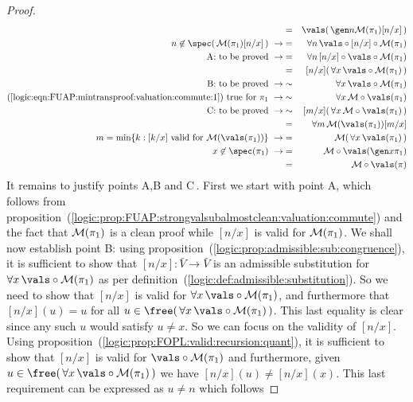 \begin{proof}
\begin{eqnarray*}
    &=&\vals(\,\gen n{\cal M}(\pi_{1})[n/x]\,)\\
    n\not\in\spec(\,{\cal M}(\pi_{1})[n/x]\,)\ \rightarrow
    &=&\forall n\,\vals\circ[n/x]\circ{\cal M}(\pi_{1})\\
    \mbox{A: to be proved}\ \rightarrow
    &=&\forall n\,[n/x]\circ\vals\circ{\cal M}(\pi_{1})\\
    &=&[n/x](\,\forall x\,\vals\circ{\cal M}(\pi_{1})\,)\\
    \mbox{B: to be proved}\ \rightarrow&\sim&\forall x\,\vals\circ{\cal M}(\pi_{1})\\
    \mbox{(\ref{logic:eqn:FUAP:mintransproof:valuation:commute:1}) true for $\pi_{1}$}\ \rightarrow
    &\sim&\forall x\,{\cal M}\circ\vals(\pi_{1})\\
    \mbox{C: to be proved}\ \rightarrow
    &\sim&[m/x](\,\forall x\,{\cal M}\circ\vals(\pi_{1})\,)\\
    &=&\forall m\,{\cal M}(\vals(\pi_{1}))[m/x]\\
    m=\min\{k:[k/x]\ \mbox{valid for}\ {\cal M}(\vals(\pi_{1}))\}\ \rightarrow
    &=&{\cal M}(\,\forall x\,\vals(\pi_{1})\,)\\
    x\not\in\spec(\pi_{1})\ \rightarrow&=&{\cal M}\circ\vals(\gen x\pi_{1})\\
    &=&{\cal M}\circ\vals(\pi)\\
    \end{eqnarray*}
It remains to justify points A,B and C\,. First we start with point
A, which follows from
proposition~(\ref{logic:prop:FUAP:strongvalsubalmostclean:valuation:commute})
and the fact that ${\cal M}(\pi_{1})$ is a clean proof while $[n/x]$
is valid for ${\cal M}(\pi_{1})$. We shall now establish point B:
using proposition~(\ref{logic:prop:admissible:sub:congruence}), it
is sufficient to show that $[n/x]:\bar{V}\to\bar{V}$ is an
admissible substitution for $\forall x\,\vals\circ{\cal M}(\pi_{1})$
as per definition~(\ref{logic:def:admissible:substitution}). So we
need to show that $[n/x]$ is valid for $\forall x\,\vals\circ{\cal
M}(\pi_{1})$, and furthermore that $[n/x](u)=u$ for all
$u\in\free(\,\forall x\,\vals\circ{\cal M}(\pi_{1})\,)$. This last
equality is clear since any such $u$ would satisfy $u\neq x$. So we
can focus on the validity of $[n/x]$. Using
proposition~(\ref{logic:prop:FOPL:valid:recursion:quant}), it is
sufficient to show that $[n/x]$ is valid for $\vals\circ{\cal
M}(\pi_{1})$ and furthermore, given $u\in\free(\,\forall
x\,\vals\circ{\cal M}(\pi_{1})\,)$ we have $[n/x](u)\neq[n/x](x)$.
This last requirement can be expressed as $u\neq n$ which follows

\end{proof}
